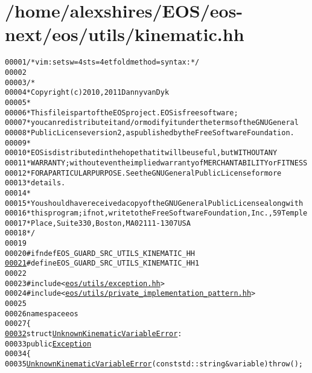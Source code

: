 \hypertarget{kinematic_8hh_source}{
\section{/home/alexshires/EOS/eos-\/next/eos/utils/kinematic.hh}
}


\begin{footnotesize}\begin{alltt}
00001 \textcolor{comment}{/* vim: set sw=4 sts=4 et foldmethod=syntax : */}
00002 
00003 \textcolor{comment}{/*}
00004 \textcolor{comment}{ * Copyright (c) 2010, 2011 Danny van Dyk}
00005 \textcolor{comment}{ *}
00006 \textcolor{comment}{ * This file is part of the EOS project. EOS is free software;}
00007 \textcolor{comment}{ * you can redistribute it and/or modify it under the terms of the GNU General}
00008 \textcolor{comment}{ * Public License version 2, as published by the Free Software Foundation.}
00009 \textcolor{comment}{ *}
00010 \textcolor{comment}{ * EOS is distributed in the hope that it will be useful, but WITHOUT ANY}
00011 \textcolor{comment}{ * WARRANTY; without even the implied warranty of MERCHANTABILITY or FITNESS}
00012 \textcolor{comment}{ * FOR A PARTICULAR PURPOSE.  See the GNU General Public License for more}
00013 \textcolor{comment}{ * details.}
00014 \textcolor{comment}{ *}
00015 \textcolor{comment}{ * You should have received a copy of the GNU General Public License along with}
00016 \textcolor{comment}{ * this program; if not, write to the Free Software Foundation, Inc., 59 Temple}
00017 \textcolor{comment}{ * Place, Suite 330, Boston, MA  02111-1307  USA}
00018 \textcolor{comment}{ */}
00019 
00020 \textcolor{preprocessor}{#ifndef EOS\_GUARD\_SRC\_UTILS\_KINEMATIC\_HH}
\hypertarget{kinematic_8hh_source_l00021}{}\hyperlink{kinematic_8hh_ae937345f1a0bad883feee65af992f923}{00021} \textcolor{preprocessor}{}\textcolor{preprocessor}{#define EOS\_GUARD\_SRC\_UTILS\_KINEMATIC\_HH 1}
00022 \textcolor{preprocessor}{}
00023 \textcolor{preprocessor}{#include <\hyperlink{exception_8hh}{eos/utils/exception.hh}>}
00024 \textcolor{preprocessor}{#include <\hyperlink{private__implementation__pattern_8hh}{eos/utils/private_implementation_pattern.hh}>}
00025 
00026 \textcolor{keyword}{namespace }eos
00027 \{
\hypertarget{kinematic_8hh_source_l00032}{}\hyperlink{structeos_1_1UnknownKinematicVariableError}{00032}     \textcolor{keyword}{struct }\hyperlink{structeos_1_1UnknownKinematicVariableError}{UnknownKinematicVariableError} :
00033         \textcolor{keyword}{public} \hyperlink{classeos_1_1Exception}{Exception}
00034     \{
00035         \hyperlink{structeos_1_1UnknownKinematicVariableError_a6f06ee64bdae813e463662c63f09d578}{UnknownKinematicVariableError}(\textcolor{keyword}{const} std::string & variable) \textcolor{keywordflow}{throw} ();

\end{alltt}
\end{footnotesize}
